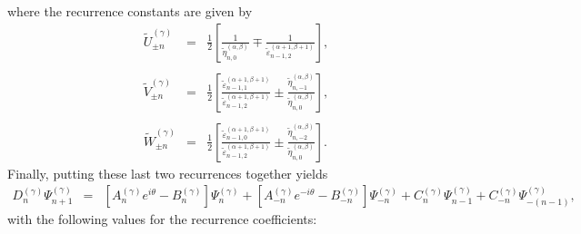 where the recurrence constants are given by
\[ \begin{array}{lll}
     \tilde{U}_{\pm n}^{(\gamma)} & = & \frac{1}{2} \left[
     \frac{1}{\tilde{\eta}_{n, 0}^{(\alpha, \beta)}} \mp
     \frac{1}{\tilde{\varepsilon}_{n - 1, 2}^{(\alpha + 1, \beta + 1)}}
     \right],\\
     &  & \\
     \tilde{V}_{\pm n}^{(\gamma)} & = & \frac{1}{2} \left[
     \frac{\tilde{\varepsilon}_{n - 1, 1}^{(\alpha + 1, \beta +
     1)}}{\tilde{\varepsilon}_{n - 1, 2}^{(\alpha + 1, \beta + 1)}} \pm
     \frac{\tilde{\eta}_{n, - 1}^{(\alpha, \beta)}}{\tilde{\eta}_{n,
     0}^{(\alpha, \beta)}} \right],\\
     &  & \\
     \tilde{W}_{\pm n}^{(\gamma)} & = & \frac{1}{2} \left[
     \frac{\tilde{\varepsilon}_{n - 1, 0}^{(\alpha + 1, \beta +
     1)}}{\tilde{\varepsilon}_{n - 1, 2}^{(\alpha + 1, \beta + 1)}} \pm
     \frac{\tilde{\eta}_{n, - 2}^{(\alpha, \beta)}}{\tilde{\eta}_{n,
     0}^{(\alpha, \beta)}} \right] .
   \end{array} \]
Finally, putting these last two recurrences together yields
\[ \begin{array}{lll}
     D_n^{(\gamma)} \Psi_{n + 1}^{(\gamma)} & = & \left[ A_n^{(\gamma)} e^{i
     \theta} - B_n^{(\gamma)} \right] \Psi_n^{(\gamma)} + \left[ A_{-
     n}^{(\gamma)} e^{- i \theta} - B_{- n}^{(\gamma)} \right] \Psi_{-
     n}^{(\gamma)} + C_n^{(\gamma)} \Psi_{n - 1}^{(\gamma)} + C_{-
     n}^{(\gamma)} \Psi_{- (n - 1)}^{(\gamma)},
   \end{array} \]
with the following values for the recurrence coefficients:
